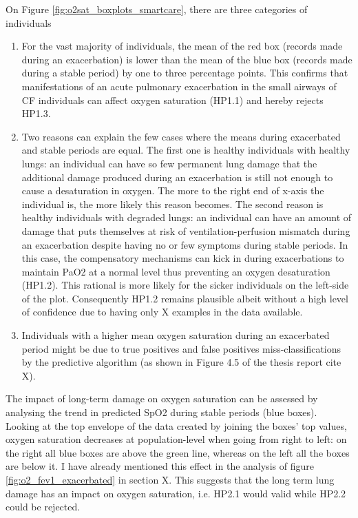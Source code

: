 On Figure \ref{fig:o2sat_boxplots_smartcare}, there are three categories of individuals
\begin{enumerate}
    \item For the vast majority of individuals, the mean of the red box (records made during an exacerbation) is lower than the mean of the blue box (records made during a stable period) by one to three percentage points. This confirms that manifestations of an acute pulmonary exacerbation in the small airways of CF individuals can affect oxygen saturation (HP1.1) and hereby rejects HP1.3.
    \item Two reasons can explain the few cases where the means during exacerbated and stable periods are equal. The first one is healthy individuals with healthy lungs: an individual can have so few permanent lung damage that the additional damage produced during an exacerbation is still not enough to cause a desaturation in oxygen. The more to the right end of x-axis the individual is, the more likely this reason becomes. The second reason is healthy individuals with degraded lungs: an individual can have an amount of damage that puts themselves at risk of ventilation-perfusion mismatch during an exacerbation despite having no or few symptoms during stable periods. In this case, the compensatory mechanisms can kick in during exacerbations to maintain PaO2 at a normal level thus preventing an oxygen desaturation (HP1.2). This rational is more likely for the sicker individuals on the left-side of the plot. Consequently HP1.2 remains plausible albeit without a high level of confidence due to having only X examples in the data available.
    \item Individuals with a higher mean oxygen saturation during an exacerbated period might be due to true positives and false positives miss-classifications by the predictive algorithm (as shown in Figure 4.5 of the thesis report cite X).
\end{enumerate}

The impact of long-term damage on oxygen saturation can be assessed by analysing the trend in predicted SpO2 during stable periods (blue boxes). Looking at the top envelope of the data created by joining the boxes' top values, oxygen saturation decreases at population-level when going from right to left: on the right all blue boxes are above the green line, whereas on the left all the boxes are below it. I have already mentioned this effect in the analysis of figure \ref{fig:o2_fev1_exacerbated} in section X. This suggests that the long term lung damage has an impact on oxygen saturation, i.e.  HP2.1 would valid while HP2.2 could be rejected.

